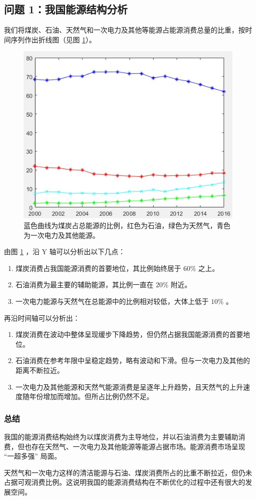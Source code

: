 \subsection{问题 1：我国能源结构分析}

  我们将煤炭、石油、天然气和一次电力及其他等能源占能源消费总量的比重，按时间序列作出折线图（见图 \ref{fig:nenyuanxiaofeibizhong}）。
  \begin{figure}[hb]
    \centering
    \includegraphics[width=0.618\paperwidth]{figures/fig1.jpg}
    \captionsetup{format=hang}
    \caption[煤炭、石油、天然气和一次电力及其他等能源占能源消费总量的比重]{蓝色曲线为煤炭占总能源的比例，红色为石油，绿色为天然气，青色为一次电力及其他能源。}
    \label{fig:nenyuanxiaofeibizhong}
  \end{figure}

  由图 \ref{fig:nenyuanxiaofeibizhong} ，沿 $\mathrm{Y}$ 轴可以分析出以下几点：
  \begin{enumerate}
    \item 煤炭消费占我国能源消费的首要地位，其比例始终居于 $60\%$ 之上。
    \item 石油消费为最主要的辅助能源，其比例一直在 $20\%$ 附近。
    \item 一次电力能源与天然气在总能源中的比例相对较低，大体上低于 $10\%$ 。
  \end{enumerate}

  再沿时间轴可以分析出：
  \begin{enumerate}
    \item 煤炭消费在波动中整体呈现缓步下降趋势，但仍然占据我国能源消费的首要地位。
    \item 石油消费在参考年限中呈稳定趋势，略有波动和下滑。但与一次电力及其他的距离不断拉近。
    \item 一次电力及其他能源和天然气能源消费是呈逐年上升趋势，且天然气的上升速度随年份增加而增加。但所占比例仍然不足。
  \end{enumerate}

  \subsubsection{总结}
  我国的能源消费结构始终为以煤炭消费为主导地位，并以石油消费为主要辅助消费，但也存在天然气、一次电力及其他能源等能源占据市场。能源消费市场呈现 “一超多强” 局面。
  
  天然气和一次电力这样的清洁能源与石油、煤炭消费所占的比重不断拉近，但仍未占据可观消费比例。这说明我国的能源消费结构在不断优化的过程中还有很大的发展空间。